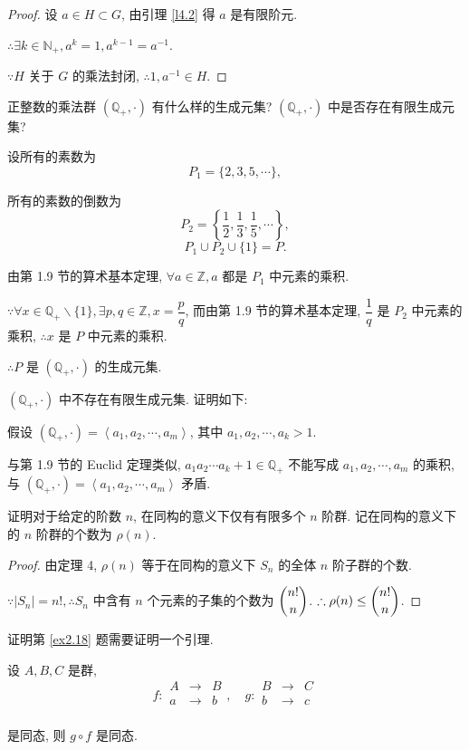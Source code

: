\documentclass{ctexart}
\begin{document}
\begin{proof}
    设 $a\in H\subset G$, 由引理 \ref{l4.2} 得 $a$ 是有限阶元.

    $\therefore\exists k\in\mathbb{N}_+,a^k=1,a^{k-1}=a^{-1}$.

    $\because H$ 关于 $G$ 的乘法封闭, $\therefore1,a^{-1}\in H$.
\end{proof}
\begin{exercise}[2.16]
    正整数的乘法群 $(\mathbb{Q}_+,\cdot)$ 有什么样的生成元集? $(\mathbb{Q}_+,\cdot)$ 中是否存在有限生成元集?
\end{exercise}
\begin{solution}
    设所有的素数为
    \[P_1=\{2,3,5,\cdots\},\]

    所有的素数的倒数为
    \[P_2=\left\{\dfrac{1}{2},\dfrac{1}{3},\dfrac{1}{5},\cdots\right\},\]
    \[P_1\cup P_2\cup\{1\}=P.\]

    由第 1.9 节的算术基本定理, $\forall a\in\mathbb{Z},a$ 都是 $P_1$ 中元素的乘积.

    $\because\forall x\in\mathbb{Q}_+\backslash\{1\},\exists p,q\in\mathbb{Z},x=\dfrac{p}{q}$, 而由第 1.9 节的算术基本定理, $\dfrac{1}{q}$ 是 $P_2$ 中元素的乘积, $\therefore x$ 是 $P$ 中元素的乘积.

    $\therefore P$ 是 $(\mathbb{Q}_+,\cdot)$ 的生成元集.

    $(\mathbb{Q}_+,\cdot)$ 中不存在有限生成元集. 证明如下:

    假设 $(\mathbb{Q}_+,\cdot)=\left<a_1,a_2,\cdots,a_m\right>$, 其中 $a_1,a_2,\cdots,a_k>1$.

    与第 1.9 节的 Euclid 定理类似, $a_1a_2\cdots a_k+1\in\mathbb{Q}_+$ 不能写成 $a_1,a_2,\cdots,a_m$ 的乘积, 与 $(\mathbb{Q}_+,\cdot)=\left<a_1,a_2,\cdots,a_m\right>$ 矛盾.
\end{solution}
\begin{exercise}[2.17]
    证明对于给定的阶数 $n$, 在同构的意义下仅有有限多个 $n$ 阶群. 记在同构的意义下的 $n$ 阶群的个数为 $\rho(n)$.
\end{exercise}
\begin{proof}
    由定理 4, $\rho(n)$ 等于在同构的意义下 $S_n$ 的全体 $n$ 阶子群的个数.

    $\because|S_n|=n!,\therefore S_n$ 中含有 $n$ 个元素的子集的个数为 $\dbinom{n!}{n}$. $\therefore\rho(n)\leq\dbinom{n!}{n}$.
\end{proof}
证明第 \ref{ex2.18} 题需要证明一个引理.
\begin{lemma}\label{l4.3}
    设 $A,B,C$ 是群,
    \[f:\begin{array}{rcl}
        A & \to & B \\
        a & \to & b \\
    \end{array},\quad g:\begin{array}{rcl}
        B & \to & C \\
        b & \to & c \\
    \end{array}\]

    是同态, 则 $g\circ f$ 是同态.
\end{lemma}
\end{document}
